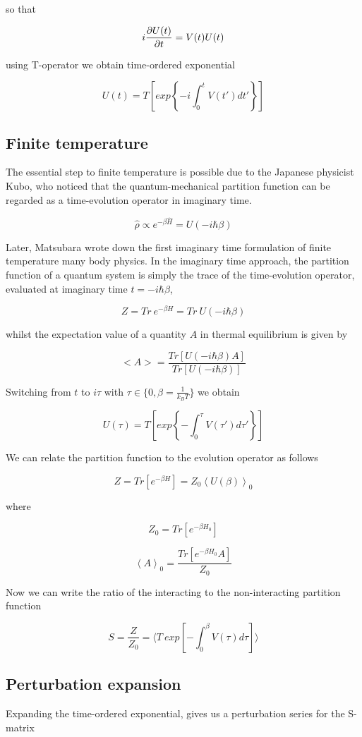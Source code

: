 so that

\[ i\frac{\partial U(t)}{\partial t} = V(t) U(t) \]

using T-operator we obtain time-ordered exponential

\[ U(t) = T\left[exp\left\{-i\int_{0}^{t}V(t')dt'\right\}\right] \]

\subsection{Finite temperature}
The essential step to finite temperature is possible due to the Japanese physicist Kubo, who noticed
that the quantum-mechanical partition function can be regarded as a time-evolution operator in imaginary time.

\[ \hat{\rho} \propto e^{-\beta \hat{H}} = U(-i\hbar\beta) \]

Later, Matsubara wrote down the first imaginary time formulation of finite temperature many body physics.
In the imaginary time approach, the partition function of a quantum system is simply the trace 
of the time-evolution operator, evaluated at imaginary time $t = -i\hbar\beta$,

\[ Z = Tr\ e^{-\beta H} = Tr\ U(-i\hbar\beta)\]

whilst the expectation value of a quantity $A$ in thermal equilibrium is given by

\[ <A> = \frac{Tr[U(-i\hbar\beta)A]}{Tr[U(-i\hbar\beta)]} \]

Switching from $t$ to $i\tau$ with $\tau\in\{0,\beta=\frac{1}{k_B T}\}$ we obtain

\[ U(\tau) = T\left[exp\left\{-\int_{0}^{\tau}V(\tau')d\tau'\right\}\right] \]

We can relate the partition function to the evolution operator as follows

\[ Z = Tr\left[e^{-\beta H}\right] = Z_0\left<U(\beta)\right>_0 \]

where 

\[ Z_0 = Tr\left[e^{-\beta H_0}\right] \]

\[ \left<A\right>_0 = \frac{Tr\left[e^{-\beta H_0}A\right]}{Z_0} \]

Now we can write the ratio of the interacting to the non-interacting partition function

\[ S = \frac{Z}{Z_0} = \langle T\ exp\left[-\int_{0}^{\beta}V(\tau)d\tau\right]\rangle \]

\subsection{Perturbation expansion}
Expanding the time-ordered exponential, gives us a perturbation series for the S-matrix

